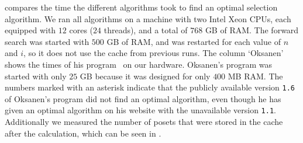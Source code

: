 \documentclass[twoside,leqno,twocolumn]{article}
\begin{document}
 compares the time the different algorithms took to find an optimal selection algorithm.
We ran all algorithms on a machine with two Intel Xeon CPUs, each equipped with $12$ cores ($24$ threads), and a total of $768$ GB of RAM.
The forward search was started with $500$ GB of RAM, and was restarted for each value of $n$ and $i$, so it does not use the cache from previous runs.
The column `Oksanen' shows the times of his program~\cite{Oksanen} on our hardware.
Oksanen's program was started with only $25$ GB because it was designed for only $400$ MB RAM.
The numbers marked with an asterisk indicate that the publicly available version \texttt{1.6} of Oksanen's program did not find an optimal algorithm, even though he has given an optimal algorithm on his website with the unavailable version \texttt{1.1}.
Additionally we measured the number of posets that were stored in the cache after the calculation, which can be seen in .

\end{document}

